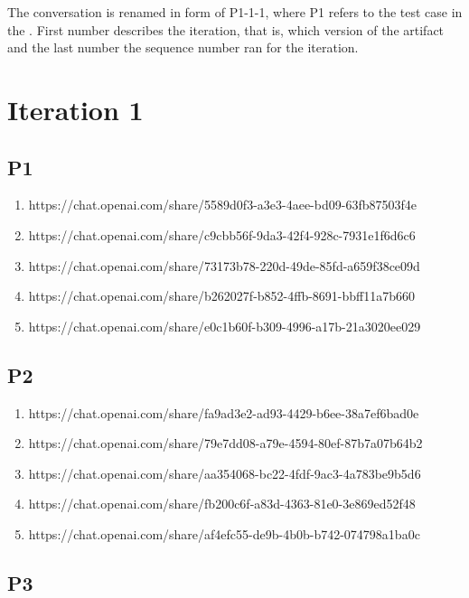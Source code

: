 

The conversation is renamed in form of P1-1-1, where P1 refers to the test case in the \textcite{act_rule_g88}. First number describes the iteration, that is, which version of the artifact and the last number the sequence number ran for the iteration.

\section{Iteration 1}

\subsection{P1}

\begin{enumerate}
    \item https://chat.openai.com/share/5589d0f3-a3e3-4aee-bd09-63fb87503f4e
    \item https://chat.openai.com/share/c9cbb56f-9da3-42f4-928c-7931e1f6d6c6
    \item https://chat.openai.com/share/73173b78-220d-49de-85fd-a659f38ce09d
    \item https://chat.openai.com/share/b262027f-b852-4ffb-8691-bbff11a7b660
    \item https://chat.openai.com/share/e0c1b60f-b309-4996-a17b-21a3020ee029
\end{enumerate}

\subsection{P2}

\begin{enumerate}
    \item https://chat.openai.com/share/fa9ad3e2-ad93-4429-b6ee-38a7ef6bad0e
    \item https://chat.openai.com/share/79e7dd08-a79e-4594-80ef-87b7a07b64b2
    \item https://chat.openai.com/share/aa354068-bc22-4fdf-9ac3-4a783be9b5d6
    \item https://chat.openai.com/share/fb200c6f-a83d-4363-81e0-3e869ed52f48
    \item https://chat.openai.com/share/af4efc55-de9b-4b0b-b742-074798a1ba0c
\end{enumerate}

\subsection{P3}

